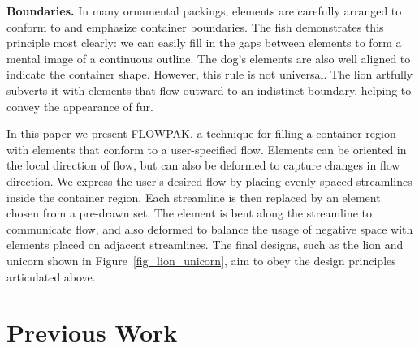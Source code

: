 \begin{items}
\item \textbf{Boundaries.} In many ornamental packings, elements are
  carefully arranged to conform to and emphasize container boundaries.
  The fish demonstrates this principle most clearly: we can easily
  fill in the gaps between elements to form a mental image of a continuous
  outline.  The dog's elements are also well aligned to indicate the
  container shape.  However, this rule is not universal.  
  The lion artfully subverts it with elements that flow outward to an
  indistinct boundary, helping to convey the appearance of fur.
\end{items}




In this paper we present FLOWPAK, a technique for filling a container 
region with elements that conform to a user-specified flow.
Elements can be oriented in the local direction 
of flow, but can also be deformed to capture changes in flow direction.
We express the user's desired flow by placing evenly spaced streamlines
inside the container region.  Each streamline is then replaced by an
element chosen from a pre-drawn set.  The element is bent along the streamline
to communicate flow, and also deformed to balance the usage of negative space
with elements placed on adjacent streamlines.  The final designs, such
as the lion and unicorn shown in Figure~\ref{fig_lion_unicorn}, aim to obey the
design principles articulated above.


\section{Previous Work}
\label{flowpak_previous_work}


